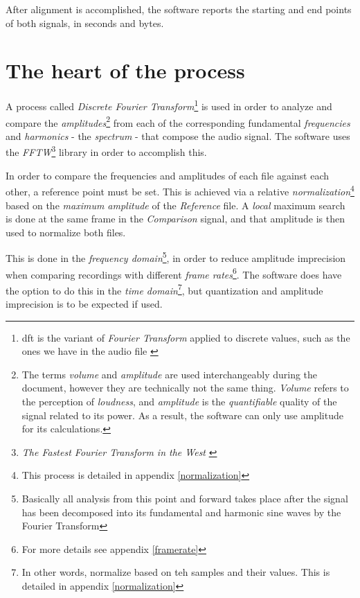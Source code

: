 \documentclass[10pt,a4paper]{report}
\begin{document}
After alignment is accomplished, the software reports the starting and end points of both signals, in seconds and bytes.

\section{The heart of the process}

A process called \textit{Discrete Fourier Transform}\footnote{\gls{dft} is the variant of \textit{Fourier Transform} applied to discrete values, such as the ones we have in the audio file \cite{FourierTransformApps}} is used in order to analyze and compare the \textit{amplitudes}\footnote{The terms \textit{volume} and \textit{amplitude} are used interchangeably during the document, however they are technically not the same thing. \textit{Volume} refers to the perception of \textit{loudness}, and \textit{amplitude} is the \textit{quantifiable} quality of the signal related to its power. As a result, the software can only use amplitude for its calculations.} from each of the corresponding fundamental \textit{frequencies} and \textit{harmonics} - the \textit{spectrum} -  that compose the audio signal. The software uses the \textit{FFTW}\footnote{\textit{The Fastest Fourier Transform in the West} \cite{fftw}} library in order to accomplish this.

In order to compare the frequencies and amplitudes of each file against each other, a reference point must be set. This is achieved via a relative \textit{normalization}\footnote{This process is detailed in appendix \ref{normalization}} based on the \textit{maximum amplitude} of the \textit{Reference} file. A \textit{local} maximum search is done at the same frame in the \textit{Comparison} signal, and that amplitude is then used to normalize both files. 

This is done in the \textit{frequency domain}\footnote{Basically all analysis from this point and forward takes place after the signal has been decomposed into its fundamental and harmonic sine waves by the Fourier Transform}, in order to reduce amplitude imprecision when comparing recordings with different \textit{frame rates}\footnote{For more details see appendix \ref{framerate}}. The software does have the option to do this in the \textit{time domain}\footnote{In other words, normalize based on teh samples and their values. This is detailed in appendix \ref{normalization}}, but quantization and amplitude imprecision is to be expected if used.
\end{document}
